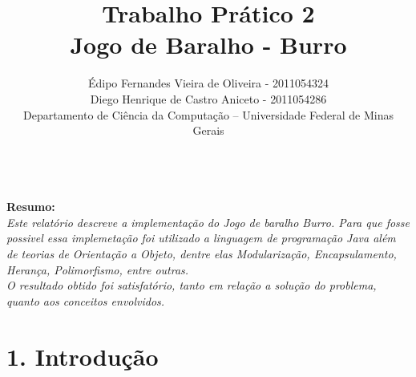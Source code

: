 \documentclass[12pt, a4paper]{article}
\begin{document}

 \title{Trabalho Prático 2 \\ Jogo de Baralho - Burro \\}
 \author{Édipo Fernandes Vieira de Oliveira - 2011054324\\ Diego Henrique de Castro Aniceto - 2011054286\\Departamento de Ciência da Computação -- Universidade Federal de Minas Gerais\\}
  \maketitle


\textbf{\textit \\Resumo: }
\textit{\\ Este relatório descreve a implementação do Jogo de baralho Burro. Para que fosse possivel essa implemetação foi utilizado a linguagem de programação Java além de teorias de Orientação a Objeto, dentre elas Modularização, Encapsulamento, Herança, Polimorfismo, entre outras.\\
  O resultado obtido foi satisfatório, tanto em relação a solução do problema, quanto aos conceitos envolvidos.}
\section*{1. Introdução}
\end{document}
